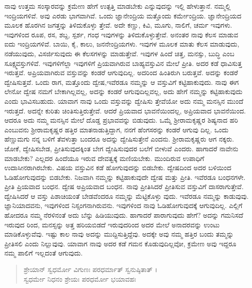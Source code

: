ನಾವು ಉತ್ತಮ ಸಂಸ್ಕಾರವನ್ನು ಕ್ರಮೇಣ ಹೇಗೆ ಉತ್ಪತ್ತಿ ಮಾಡಬೇಕು ಎನ್ನುವುದನ್ನು ಇಲ್ಲಿ ಹೇಳುತ್ತಾನೆ. ನಮ್ಮಲ್ಲಿ ಇಂದ್ರಿಯಗಳಿವೆ. ಅವು ಎರಡು ಭಾಗವಾಗಿವೆ. ಒಂದು ಜ್ಞಾನೇಂದ್ರಿಯ ಮತ್ತೊಂದು ಕರ್ಮೇಂದ್ರಿಯ. ಜ್ಞಾನೇಂದ್ರಿಯದ ಮೂಲಕ ಹೊರಗಿನ ಜಗತ್ತನ್ನು ತಿಳಿದುಕೊಳ್ಳು ತ್ತೇವೆ. ಅದೇ ಕಣ್ಣು, ಕಿವಿ, ಮೂಗು, ನಾಲಿಗೆ, ಚರ್ಮ ಇವುಗಳು. ಇವುಗಳಿಂದ ರೂಪ, ರಸ, ಶಬ್ದ, ಸ್ಪರ್ಶ, ಗಂಧ ಇವುಗಳನ್ನು ತಿಳಿದುಕೊಳ್ಳುತ್ತೇವೆ. ಅನಂತರ ನಾವು ಕೆಲಸ ಮಾಡುವ ಐದು ಇಂದ್ರಿಯಗಳಿವೆ. ಬಾಯಿ, ಕೈ, ಕಾಲು, ಜನನೇಂದ್ರಿಯಗಳು. ಇವುಗಳ ಮೂಲಕ ಮಾತು ಕೆಲಸ ಮಾಡುವುದು, ನಡೆಯುವುದು, ವಿಸರ್ಜಿಸುವುದು ಈ ಕೆಲಸಗಳನ್ನು ಮಾಡುತ್ತೇವೆ. ಇವುಗಳ ಹಿಂದೆ ಚಿತ್ತ, ಮನಸ್ಸು, ಬುದ್ಧಿ ಎಂಬ ಸೂಕ್ಷ್ಮವಸ್ತುಗಳಿವೆ. ಇವುಗಳಿಗೆಲ್ಲಾ ಇವುಗಳಿಗೆ ಪ್ರಿಯವಾಗಿರುವ ಬಾಹ್ಯವಸ್ತುವಿನ ಮೇಲೆ ಪ್ರೀತಿ. ಅದರ ಕಡೆ ಧಾವಿಸುತ್ತ ಇರುತ್ತವೆ. ಅಪ್ರಿಯವಾಗಿರುವ ವಸ್ತುವನ್ನು ಕಂಡರೆ ಆಗುವುದಿಲ್ಲ. ಅದರಿಂದ ಹಿಂತಿರುಗಿ ಬರುತ್ತವೆ. ಅದನ್ನು ಕಂಡರೆ ದ್ವೇಷಿಸುತ್ತವೆ. ಒಂದು ರಾಗ, ಮತ್ತೊಂದು ದ್ವೇಷ,ಇವೆರಡೂ ನಮ್ಮನ್ನು ಆ ವಸ್ತುವಿಗೆ ಕಟ್ಟಿಹಾಕುವುದು. ನಾವು ಈಗ ಲೇನೋ ದ್ವೇಷ ನಮಗೆ ಬೇಕಾಗಿಲ್ಲವಲ್ಲ, ಅದನ್ನು ಕಂಡರೆ ಆಗುವುದಿಲ್ಲವಲ್ಲ, ಅದು ಹೇಗೆ ನಮ್ಮನ್ನು ಕಟ್ಟಿಹಾಕುವುದು ಎಂದು ಭಾವಿಸಬಹುದು. ಯಾವಾಗ ನಾವು ಒಂದು ವಸ್ತುವನ್ನು ದ್ವೇಷಿಸು ತ್ತೇವೆಯೋ ಅದು ನಮ್ಮ ಮನಸ್ಸಿನ ಮುಂದೆ ಇರುತ್ತದೆ. ಅದನ್ನೇ ಕುರಿತು ಚಿಂತಿಸುತ್ತಿರುತ್ತೇವೆ. ಆದರೆ ಪ್ರಿಯವಾದ ಭಾವನೆಯಿಂದಲ್ಲ, ಅಪ್ರಿಯವಾದ ಭಾವನೆಯಿಂದ. ಆದರೂ ಅದು ನಮ್ಮ ಮನಸ್ಸಿನ ಮೇಲೆ ದೊಡ್ಡ ಪ್ರಭಾವವನ್ನು ಬಿಡುವುದು. ಒಮ್ಮೆ ಶ್ರೀರಾಮಕೃಷ್ಣರ ಶಿಷ್ಯನಾದ ಹರಿ ಎಂಬುವನು ಶ್ರೀರಾಮಕೃಷ್ಣರ ಹತ್ತಿರ ಮಾತನಾಡುತ್ತಿದ್ದಾಗ, ನನಗೆ ಹೆಂಗಸರನ್ನು ಕಂಡರೆ ಆಗುವು ದಿಲ್ಲ. ಒಂದು ಹೆಣ್ಣುಮಗು ನನ್ನ ಬಳಿಗೆ ತೆವಳುತ್ತಾ ಬಂದರೂ ಅದನ್ನು ದ್ವೇಷಿಸುತ್ತೇನೆ ಎಂದನು. ಶ್ರೀರಾಮಕೃಷ್ಣರು ಆಗ ನಕ್ಕರು. ಜೋಕೆ, ದ್ವೇಷಿಸಬೇಡ, ಪ್ರೀತಿಸುವುದಕ್ಕಿಂತ ಬೇಗ ದ್ವೇಷಿಸುವುದರ ಬಲೆಗೆ ಬೀಳುವೆ ಎಂದರು. ಹಾಗಾದರೆ ನಾವೇನು ಮಾಡಬೇಕು? ಎಲ್ಲದರ ಹಿಂದೆಯೂ ಇರುವ ದೇವತ್ವಕ್ಕೆ ಮಣಿಯಬೇಕು. ಮುಂದಿರುವ ಉಪಾಧಿಗೆ ಉದಾಸೀನರಾಗಿರಬೇಕು. ವಿಷಯ ವಸ್ತುವಿನ ಕಡೆ ಹೋಗುವುದನ್ನು ಬಿಡಬೇಕು. ದ್ವೇಷದಿಂದ ಅದರ ಬಳಿಯಿಂದ ಓಡಿಹೋಗುವುದನ್ನು ಬಿಡಬೇಕು. ನಿಜವಾಗಿ ನಮ್ಮನ್ನು ಕಟ್ಟಿಹಾಕುವುದೇ ದ್ವೇಷ ಮತ್ತು ಪ್ರೀತಿ. ಇವೆರಡೂ ಬಂಧನಗಳೇ. ಪ್ರೀತಿ ಪ್ರಿಯವಾದ ಬಂಧನ. ದ್ವೇಷ ಅಪ್ರಿಯವಾದ ಬಂಧನ. ನಾವು ಪ್ರೀತಿಸಿದರೆ ಪ್ರೀತಿಸುವ ವಸ್ತುವಿಗೆ ದಾಸರಾಗುತ್ತೇವೆ. ದ್ವೇಷಿಸಿದರೆ ಆ ವಸ್ತು ಪಿಶಾಚಿಯಂತೆ ಬೇಡವೆಂದರೂ ನಮ್ಮನ್ನು ಮೆಟ್ಟಿಕೊಳ್ಳು ವುದು. ಇವೆರಡೂ ನಮ್ಮನ್ನು ಕಾಡುವುವು. ಜ್ಞಾನಿಯಾದವನು, ಇವುಗಳಿಂದ ನಿಸ್ಸಂಗನಾಗಿರುವನು. ಇವುಗಳಿಂದ ನಾವು ಓಡಿಹೋಗುವುದಕ್ಕೆ ಆಗುವುದಿಲ್ಲ. ಎಲ್ಲಿಗೆ ಹೋದರೂ ನಮ್ಮ ನೆರಳಿನಂತೆ ಅದು ಬೆನ್ನು ಹಿಡಿಯುವುದು. ಹಾಗಾದರೆ ಪಾರಾಗುವುದು ಹೇಗೆ? ಅದನ್ನು ಗಮನಿಸದೆ ಇರುವುದ ರಿಂದ, ಮನಸ್ಸನ್ನು ಅತ್ತ ಹರಿಯಬಿಡದೆ ಇರುವುದರಿಂದ ಅದರ ಮೇಲೆ ಅನಾದರವನ್ನು ಉಂಟು ಮಾಡಿಕೊಳ್ಳುವೆವು. ಇಷ್ಟು ಕಾಲ ನಾವು ಅದನ್ನು ಮುದ್ದಿಸುತ್ತಿದ್ದೆವು. ಅದಕ್ಕೇ ಅವು ನಮ್ಮ ಹತ್ತಿರ ಬಂದು ತಮ್ಮನ್ನು ಪ್ರೀತಿಸಲಿ ಎಂದು ನಿಲ್ಲುವುವು. ಯಾವಾಗ ನಾವು ಅದರ ಕಡೆ ಗಮನ ಕೊಡುವುದಿಲ್ಲವೋ, ಕ್ರಮೇಣ ಅವು ಇದ್ದರೂ ನಮ್ಮ ಪಾಲಿಗೆ ಇಲ್ಲದಂತೆ ಆಗುವುದು.

\begin{verse}
ಶ್ರೇಯಾನ್ ಸ್ವಧರ್ಮೋ ವಿಗುಣಃ ಪರಧರ್ಮಾತ್ ಸ್ವನುಷ್ಠಿತಾತ್ ।\\ಸ್ವಧರ್ಮೇ ನಿಧನಂ ಶ್ರೇಯಃ ಪರಧರ್ಮೋ ಭಯಾವಹಃ 
\end{verse}


